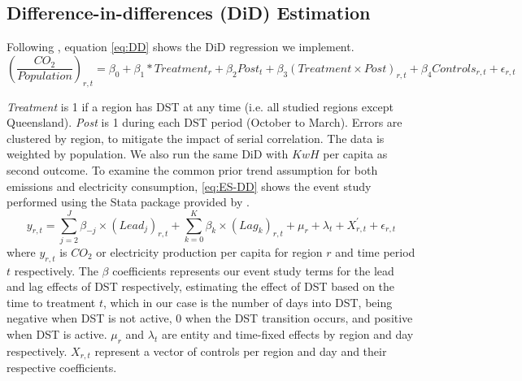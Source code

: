\subsection{Difference-in-differences (DiD) Estimation}
Following \textcites{callaway_difference--differences_2021, goodman-bacon_difference--differences_2021}, equation \ref{eq:DD} shows the \ac{DiD} regression we implement.
\begin{equation}
    \left(\frac{CO_2}{Population}\right)_{r,t}
 = \beta_0 + \beta_1*Treatment_{r} + \beta_2Post_{t} + \beta_3(Treatment \times Post)_{r,t} + \beta_4 Controls_{r,t}
     + \epsilon_{r,t}
     \label{eq:DD}
\end{equation}

\textit{Treatment} is 1 if a region has \ac{DST} at any time (i.e. all studied regions except Queensland). \textit{Post} is 1 during each \ac{DST} period (October to March). Errors are clustered by region, to mitigate the impact of serial correlation. The data is weighted by population. We also run the same \ac{DiD} with $KwH$ per capita as second outcome.
To examine the common prior trend assumption for both emissions and electricity consumption, \ref{eq:ES-DD} shows the event study performed using the Stata package provided by \textcite{clarke_implementing_2021}.
\begin{equation}
    y_{r,t} = \sum_{j=2}^{J} \beta_{-j} \times (Lead_j)_{r,t} + \sum_{k=0}^K \beta_{k} \times (Lag_k)_{r,t} + \mu_r + \lambda_t + X^{'}_{r,t} + \epsilon_{r,t}
    \label{eq:ES-DD}
\end{equation}
where $y_{r,t}$ is $CO_2$ or electricity production per capita for region $r$ and time period $t$ respectively. The $\beta$ coefficients represents our event study terms for the lead and lag effects of DST respectively, estimating the effect of DST based on the time to treatment $t$, which in our case is the number of days into DST, being negative when DST is not active, 0 when the DST transition occurs, and positive when DST is active. $\mu_r$ and $\lambda_t$ are entity and time-fixed effects by region and day respectively. $X_{r,t}$ represent a vector of controls per region and day and their respective coefficients.  

